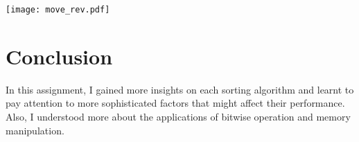 \documentclass[12pt]{article}
\begin{document}
\texttt{[image: move\_rev.pdf]}

\section{Conclusion}

In this assignment, I gained more insights on each sorting algorithm and learnt to pay attention to more sophisticated factors that might affect their performance. Also, I understood more about the applications of bitwise operation and memory manipulation. 
\end{document}
